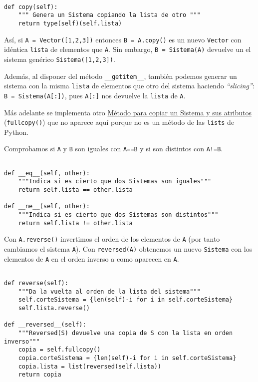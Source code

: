 \documentclass[11pt]{report}
\begin{document}
\begin{verbatim}

def copy(self):
    """ Genera un Sistema copiando la lista de otro """
    return type(self)(self.lista)

\end{verbatim}

Así, si \texttt{A = Vector([1,2,3])} entonces \texttt{B = A.copy()} es un nuevo \texttt{Vector} con idéntica \texttt{lista} de
elementos que \texttt{A}. Sin embargo, \texttt{B = Sistema(A)} devuelve un el sistema genérico \texttt{Sistema([1,2,3])}.

Además, al disponer del método \texttt{\_\_getitem\_\_}, también podemos generar un sistema con la misma
\texttt{lista} de elementos que otro del sistema haciendo \emph{``slicing''}: \texttt{B = Sistema(A[:])}, pues \texttt{A[:]}
nos devuelve la \texttt{lista} de \texttt{A}.

Más adelante se implementa otro \hyperref[sec:orgfe33b74]{Método para copiar un Sistema y sus atributos} (\texttt{fullcopy()}) que no
aparece aquí porque no es un método de las \texttt{lists} de Python.

\medskip

Comprobamos si \texttt{A} y \texttt{B} son iguales con \texttt{A==B} y si son distintos con \texttt{A!=B}.

\begin{verbatim}

def __eq__(self, other):
    """Indica si es cierto que dos Sistemas son iguales"""
    return self.lista == other.lista

def __ne__(self, other):
    """Indica si es cierto que dos Sistemas son distintos"""
    return self.lista != other.lista

\end{verbatim}

Con \texttt{A.reverse()} invertimos el orden de los elementos de \texttt{A} (por tanto cambiamos el sistema
\texttt{A}). Con \texttt{reversed(A)} obtenemos un nuevo \texttt{Sistema} con los elementos de \texttt{A} en el orden inverso a
como aparecen en \texttt{A}.

\begin{verbatim}

def reverse(self):
    """Da la vuelta al orden de la lista del sistema"""
    self.corteSistema = {len(self)-i for i in self.corteSistema}
    self.lista.reverse()
    
def __reversed__(self):
    """Reversed(S) devuelve una copia de S con la lista en orden inverso"""
    copia = self.fullcopy()
    copia.corteSistema = {len(self)-i for i in self.corteSistema}
    copia.lista = list(reversed(self.lista))
    return copia
    
\end{verbatim}
\end{document}
